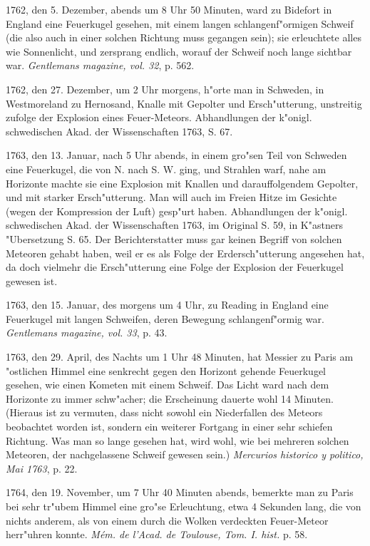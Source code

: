 \documentclass[a4paper, 11pt, oneside, polutonikogreek, german]{article}
\begin{document}
1762, den 5. Dezember, abends um 8 Uhr 50 Minuten, ward zu Bidefort in England eine Feuerkugel gesehen, mit einem langen schlangenf"ormigen Schweif (die also auch in einer solchen Richtung muss gegangen sein); sie erleuchtete alles wie Sonnenlicht, und zersprang endlich, worauf der Schweif noch lange sichtbar war. \emph{Gentlemans magazine, vol. 32}, p. 562.

1762, den 27. Dezember, um 2 Uhr morgens, h"orte man in Schweden, in Westmoreland zu Hernosand, Knalle mit Gepolter und Ersch"utterung, unstreitig zufolge der Explosion eines Feuer-Meteors. Abhandlungen der k"onigl. schwedischen Akad. der Wissenschaften 1763, S. 67.

1763, den 13. Januar, nach 5 Uhr abends, in einem gro"sen Teil von Schweden eine Feuerkugel, die von N. nach S. W. ging, und Strahlen warf, nahe am Horizonte machte sie eine Explosion mit Knallen und darauffolgendem Gepolter, und mit starker Ersch"utterung. Man will auch im Freien Hitze im Gesichte (wegen der Kompression der Luft) gesp"urt haben. Abhandlungen der k"onigl. schwedischen Akad. der Wissenschaften 1763, im Original S. 59, in K"astners "Ubersetzung S. 65. Der Berichterstatter muss gar keinen Begriff von solchen Meteoren gehabt haben, weil er es als Folge der Erdersch"utterung angesehen hat, da doch vielmehr die Ersch"utterung eine Folge der Explosion der Feuerkugel gewesen ist.

1763, den 15. Januar, des morgens um 4 Uhr, zu Reading in England eine Feuerkugel mit langen Schweifen, deren Bewegung schlangenf"ormig war. \emph{Gentlemans magazine, vol. 33}, p. 43.

1763, den 29. April, des Nachts um 1 Uhr 48 Minuten, hat Messier zu Paris am "ostlichen Himmel eine senkrecht gegen den Horizont gehende Feuerkugel gesehen, wie einen Kometen mit einem Schweif. Das Licht ward nach dem Horizonte zu immer schw"acher; die Erscheinung dauerte wohl 14 Minuten. (Hieraus ist zu vermuten, dass nicht sowohl ein Niederfallen des Meteors beobachtet worden ist, sondern ein weiterer Fortgang in einer sehr schiefen Richtung. Was man so lange gesehen hat, wird wohl, wie bei mehreren solchen Meteoren, der nachgelassene Schweif gewesen sein.) \emph{Mercurios historico y politico, Mai 1763}, p. 22.

1764, den 19. November, um 7 Uhr 40 Minuten abends, bemerkte man zu Paris bei sehr tr"ubem Himmel eine gro"se Erleuchtung, etwa 4 Sekunden lang, die von nichts anderem, als von einem durch die Wolken verdeckten Feuer-Meteor herr"uhren konnte. \emph{Mém. de l'Acad. de Toulouse, Tom. I. hist.} p. 58.
\end{document}
